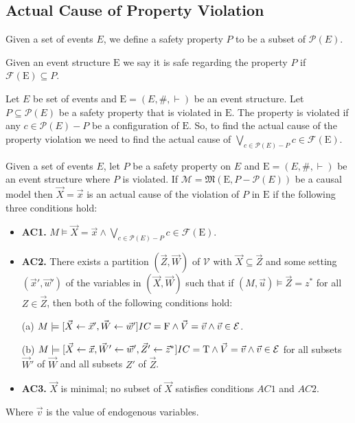 \subsection{Actual Cause of Property Violation}
\begin{definition}
    Given a set of events $E$, we define a safety property $P$ to be a
    subset of $\mathcal{P}(E)$.
\end{definition}
\begin{definition}
    Given an event structure $\mathrm{E}$ we say it is safe regarding the 
    property $P$ if $\mathcal{F}(\mathrm{E}) \subseteq P$.
\end{definition}
Let $E$ be set of events and $\mathrm{E} = (E,\#,\vdash)$ be an event structure.
Let $P \subseteq \mathcal{P}(E)$ be a safety property that is violated in 
$\mathrm{E}$.
The property is violated if any $c \in \mathcal{P}(E) - P$ be a configuration
of $\mathrm{E}$. 
So, to find the actual cause of the property violation we need to find 
the actual cause of 
$\bigvee_{c \in \mathcal{P}(E) - P}c \in \mathcal{F}(\mathrm{E})$.
\begin{definition}
    Given a set of events $E$, let $P$ be a safety property on $E$ and 
    $\mathrm{E} = (E,\#,\vdash)$ be an event structure where $P$ is violated.
    If $\mathcal{M} = \mathfrak{M}(\mathrm{E}, P - \mathcal{P}(E))$
    be a causal model then $\vec X = \vec x$ is
    an actual cause of the violation of $P$ in $\mathrm{E}$ if the
    following three conditions hold:
    \begin{itemize}
        \item  \textbf{AC1.} $M\models \vec X = \vec x
                  \wedge \bigvee_{c \in \mathcal{P}(E) - P}c \in \mathcal{F}(\mathrm{E})$.
        \item  \textbf{AC2. }There exists a partition $(\vec Z, \vec W)$ of $\mathcal{V}$ with $\vec X \subseteq \vec Z$ and some setting $(\vec x',\vec w')$ of the variables in $(\vec X,\vec W)$ such that if $(M,\vec u)\models \vec Z = z^*$ for all $Z\in \vec Z$, then both of the following conditions hold:

              (a) $M \models[\vec X \leftarrow \vec x', \vec W \leftarrow \vec w']
                  IC = \mathrm{F}
                  \wedge \vec V = \vec v
                  \wedge  \vec v \in \mathcal{E}$.

              (b) $M \models[\vec X\leftarrow \vec x, \vec W' \leftarrow \vec w', \vec Z'\leftarrow \vec z^*]
                  IC = \mathrm{T}
                  \wedge \vec V = \vec v
                  \wedge \vec v \in \mathcal{E}$
              for all subsets $\vec W'$ of $\vec W$ and all subsets $Z'$ of $\vec Z$.

        \item  \textbf{AC3.} $\vec X$ is minimal; no subset of $\vec X$ satisfies conditions $AC1$ and $AC2$.
    \end{itemize}
    Where $\vec v$ is the value of endogenous variables.
\end{definition}
\pagebreak


